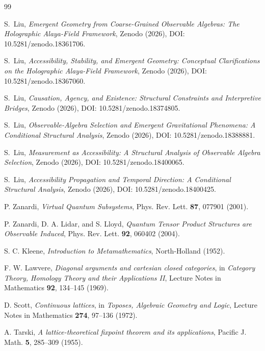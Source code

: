 \documentclass[12pt,a4paper]{article}
\begin{document}
\begin{thebibliography}{99}

S.~Liu, \emph{Emergent Geometry from Coarse-Grained Observable Algebras: The Holographic Alaya-Field Framework}, Zenodo (2026), DOI: 10.5281/zenodo.18361706.

S.~Liu, \emph{Accessibility, Stability, and Emergent Geometry: Conceptual Clarifications on the Holographic Alaya-Field Framework}, Zenodo (2026), DOI: 10.5281/zenodo.18367060.

S.~Liu, \emph{Causation, Agency, and Existence: Structural Constraints and Interpretive Bridges}, Zenodo (2026), DOI: 10.5281/zenodo.18374805.

S.~Liu, \emph{Observable-Algebra Selection and Emergent Gravitational Phenomena: A Conditional Structural Analysis}, Zenodo (2026), DOI: 10.5281/zenodo.18388881.

S.~Liu, \emph{Measurement as Accessibility: A Structural Analysis of Observable Algebra Selection}, Zenodo (2026), DOI: 10.5281/zenodo.18400065.

S.~Liu, \emph{Accessibility Propagation and Temporal Direction: A Conditional Structural Analysis}, Zenodo (2026), DOI: 10.5281/zenodo.18400425.

P. Zanardi, \emph{Virtual Quantum Subsystems}, Phys. Rev. Lett. \textbf{87}, 077901 (2001).

P. Zanardi, D. A. Lidar, and S. Lloyd, \emph{Quantum Tensor Product Structures are Observable Induced}, Phys. Rev. Lett. \textbf{92}, 060402 (2004).

S. C. Kleene, \emph{Introduction to Metamathematics}, North-Holland (1952).

F. W. Lawvere, \emph{Diagonal arguments and cartesian closed categories}, in \emph{Category Theory, Homology Theory and their Applications II}, Lecture Notes in Mathematics \textbf{92}, 134--145 (1969).

D. Scott, \emph{Continuous lattices}, in \emph{Toposes, Algebraic Geometry and Logic}, Lecture Notes in Mathematics \textbf{274}, 97--136 (1972).

A. Tarski, \emph{A lattice-theoretical fixpoint theorem and its applications}, Pacific J. Math. \textbf{5}, 285--309 (1955).

\end{thebibliography}
\end{document}
